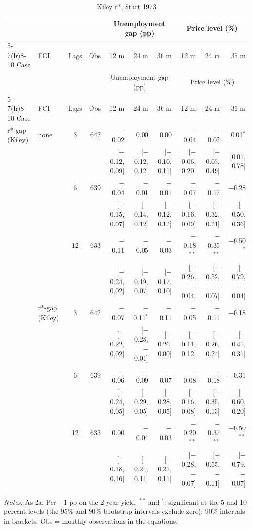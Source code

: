 \begingroup\scriptsize\setlength{\tabcolsep}{0.9pt}
\begin{longtable}{llcrrrrrrr}
\caption{Kiley r*, Start 1973}\label{tab:appR2b}\\
\toprule
 & & & & \multicolumn{3}{c}{Unemployment gap (pp)} & \multicolumn{3}{c}{Price level (\%)}\\ \cmidrule(lr){5-7}\cmidrule(lr){8-10}
Case & FCI & Lags & Obs & 12 m & 24 m & 36 m & 12 m & 24 m & 36 m\\
\midrule\endfirsthead
\toprule
 & & & & \multicolumn{3}{c}{Unemployment gap (pp)} & \multicolumn{3}{c}{Price level (\%)}\\ \cmidrule(lr){5-7}\cmidrule(lr){8-10}
Case & FCI & Lags & Obs & 12 m & 24 m & 36 m & 12 m & 24 m & 36 m\\
\midrule\endhead
\bottomrule\endfoot
r*-gap (Kiley) & none & 3 & 642 & $-$0.02 & 0.00 & 0.00 & $-$0.04 & $-$0.02 & 0.01$^{*}$\\
 & & & & {\scriptsize [$-$0.12, 0.09]} & {\scriptsize [$-$0.12, 0.12]} & {\scriptsize [$-$0.10, 0.11]} & {\scriptsize [$-$0.06, 0.20]} & {\scriptsize [$-$0.03, 0.49]} & {\scriptsize [0.01, 0.78]}\\
 &  & 6 & 639 & $-$0.04 & $-$0.01 & $-$0.01 & $-$0.07 & $-$0.17 & $-$0.28\\
 & & & & {\scriptsize [$-$0.15, 0.07]} & {\scriptsize [$-$0.14, 0.12]} & {\scriptsize [$-$0.12, 0.12]} & {\scriptsize [$-$0.16, 0.09]} & {\scriptsize [$-$0.32, 0.21]} & {\scriptsize [$-$0.50, 0.36]}\\
 &  & 12 & 633 & $-$0.11 & $-$0.05 & $-$0.03 & $-$0.18$^{**}$ & $-$0.35$^{**}$ & $-$0.50$^{*}$\\
 & & & & {\scriptsize [$-$0.24, 0.02]} & {\scriptsize [$-$0.19, 0.07]} & {\scriptsize [$-$0.17, 0.10]} & {\scriptsize [$-$0.26, $-$0.04]} & {\scriptsize [$-$0.52, $-$0.07]} & {\scriptsize [$-$0.79, $-$0.04]}\\
 & r*-gap (Kiley) & 3 & 642 & $-$0.07 & $-$0.11$^{*}$ & $-$0.11 & $-$0.05 & $-$0.11 & $-$0.18\\
 & & & & {\scriptsize [$-$0.22, 0.02]} & {\scriptsize [$-$0.28, $-$0.01]} & {\scriptsize [$-$0.26, 0.00]} & {\scriptsize [$-$0.11, 0.12]} & {\scriptsize [$-$0.26, 0.24]} & {\scriptsize [$-$0.41, 0.31]}\\
 &  & 6 & 639 & $-$0.06 & $-$0.09 & $-$0.07 & $-$0.08 & $-$0.18 & $-$0.31\\
 & & & & {\scriptsize [$-$0.24, 0.05]} & {\scriptsize [$-$0.29, 0.05]} & {\scriptsize [$-$0.28, 0.05]} & {\scriptsize [$-$0.16, 0.08]} & {\scriptsize [$-$0.35, 0.13]} & {\scriptsize [$-$0.60, 0.20]}\\
 &  & 12 & 633 & 0.00 & $-$0.04 & $-$0.03 & $-$0.20$^{**}$ & $-$0.37$^{**}$ & $-$0.50$^{**}$\\
 & & & & {\scriptsize [$-$0.18, 0.16]} & {\scriptsize [$-$0.24, 0.11]} & {\scriptsize [$-$0.21, 0.11]} & {\scriptsize [$-$0.28, $-$0.07]} & {\scriptsize [$-$0.55, $-$0.11]} & {\scriptsize [$-$0.79, $-$0.07]}\\
\end{longtable}
\begin{flushleft}\footnotesize\textit{Notes:} As 2a. Per +1 pp on the 2-year yield. $^{**}$ and $^{*}$: significant at the 5 and 10 percent levels (the 95\% and 90\% bootstrap intervals exclude zero); 90\% intervals in brackets. Obs = monthly observations in the equations.\end{flushleft}
\endgroup
